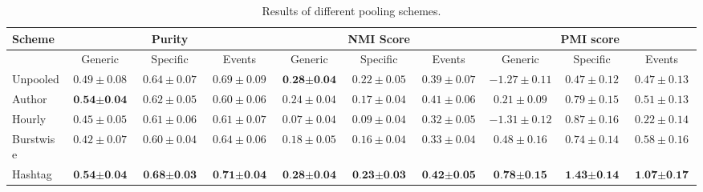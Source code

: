 \documentclass{sig-alternate}
\begin{document}
\begin{table*}[t!]
\vspace{-2mm}
\centering
\caption{Results of different pooling schemes.}\label{tbl-456}
\resizebox{17.5cm}{!} 
{
	\begin{tabular}{|l|ccc|ccc|ccc|}
	\hline
	Scheme  & \multicolumn {3}{c|}{Purity} & \multicolumn {3}{c|}{NMI Score} & \multicolumn {3}{c|}{PMI score} \\
	\hline
	 & Generic & Specific & Events &  Generic & Specific & Events &  Generic & Specific & Events \\
	\hline
	Unpooled & $ 0.49\pm 0.08 $ & $ 0.64\pm 0.07 $ & $ 0.69\pm 0.09 $ & $ \textbf{0.28} \pm \textbf{0.04} $ & $ 0.22\pm 0.05 $ & $ 0.39\pm 0.07 $ & $ -1.27\pm 0.11 $ & $ 0.47\pm 0.12 $ & $ 0.47\pm 0.13 $\\
	\hline
	Author & $ \textbf{0.54} \pm \textbf{0.04} $ & $ 0.62\pm 0.05 $ & $ 0.60\pm 0.06 $ & $ 0.24\pm 0.04 $ & $ 0.17\pm 0.04 $ & $ 0.41\pm 0.06 $ & $ 0.21\pm 0.09 $ & $ 0.79\pm 0.15 $ & $ 0.51\pm 0.13 $\\
	\hline
	Hourly & $ 0.45\pm 0.05 $ & $ 0.61\pm 0.06 $ & $ 0.61\pm 0.07 $ & $ 0.07\pm 0.04 $ & $ 0.09\pm 0.04 $ & $ 0.32\pm 0.05 $ & $ -1.31\pm 0.12 $ & $ 0.87\pm 0.16 $ & $ 0.22\pm 0.14 $\\
	\hline
	Burstwise & $ 0.42\pm 0.07 $ & $ 0.60\pm 0.04 $ & $ 0.64\pm 0.06 $ & $ 0.18\pm 0.05 $ & $ 0.16\pm 0.04 $ & $ 0.33\pm 0.04 $ & $ 0.48\pm 0.16 $ & $ 0.74\pm 0.14 $ & $ 0.58\pm 0.16 $\\
	\hline
	Hashtag & $ \textbf{0.54}\pm \textbf{0.04} $ & $ \textbf{0.68}\pm \textbf{0.03} $ & $ \textbf{0.71}\pm \textbf{0.04} $ & $ \textbf{0.28}\pm \textbf{0.04} $ & $ \textbf{0.23}\pm \textbf{0.03} $ & $ \textbf{0.42}\pm \textbf{0.05} $ & $ \textbf{0.78}\pm \textbf{0.15} $ & $ \textbf{1.43}\pm  \textbf{0.14} $ & $ \textbf{1.07}\pm\textbf{0.17} $\\
	\hline
	\end{tabular}
}
\end{table*}


\begin{comment}
An obvious question to ask is: Can we do better? In
the next section we look into hashtag-based pooling in detail and
devise methods which further improve the results and provide better
topics.  We did not evaluate the held-out probability in later
experiments as it agreed generally with the other scores,
and is not as appropriate  as a quality metric for the
undirected information task.
\end{comment}
\end{document}

